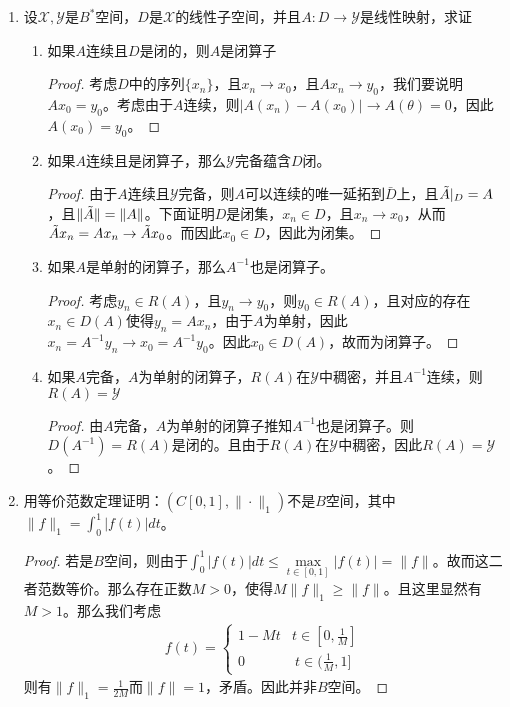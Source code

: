 \begin{enumerate}[leftmargin=2cm, label=\arabic*]
		\item 设$\mathscr{X},\mathscr{Y}$是$B^*$空间，$D$是$\mathscr{X}$的线性子空间，并且$A:D\to\mathscr{Y}$是线性映射，求证
		\begin{enumerate}[leftmargin=1cm, label=(\arabic*)]
			\item 如果$A$连续且$D$是闭的，则$A$是闭算子
			\begin{proof}
				考虑$D$中的序列$\{x_n\}$，且$x_n\to x_0$，且$Ax_n \to y_0$，我们要说明$Ax_0 = y_0$。考虑由于$A$连续，则$|A(x_n) - A(x_0)| \to A(\theta) = 0$，因此$A(x_0) = y_0$。
			\end{proof}
			
			\item 如果$A$连续且是闭算子，那么$\mathscr{Y}$完备蕴含$D$闭。
			\begin{proof}
				由于$A$连续且$\mathscr{Y}$完备，则$A$可以连续的唯一延拓到$\bar{D}$上，且$\Tilde{A}|_D = A$，且$\|\Tilde{A}\| = \|A\|$。下面证明$D$是闭集，$x_n\in D$，且$x_n\to x_0$，从而$\Tilde{A}x_n = Ax_n \to \Tilde{A}x_0$。而因此$x_0\in D$，因此为闭集。
			\end{proof}
			
			\item 如果$A$是单射的闭算子，那么$A^{-1}$也是闭算子。
			\begin{proof}
				考虑$y_n\in R(A)$，且$y_n \to y_0$，则$y_0\in R(A)$，且对应的存在$x_n\in D(A)$使得$y_n = Ax_n$，由于$A$为单射，因此$x_n = A^{-1}y_n \to x_0 = A^{-1}y_0$。因此$x_0\in D(A)$，故而为闭算子。
			\end{proof}
			
			\item 如果$A$完备，$A$为单射的闭算子，$R(A)$在$\mathscr{Y}$中稠密，并且$A^{-1}$连续，则$R(A) = \mathscr{Y}$
			\begin{proof}
				由$A$完备，$A$为单射的闭算子推知$A^{-1}$也是闭算子。则$D(A^{-1}) = R(A)$是闭的。且由于$R(A)$在$\mathscr{Y}$中稠密，因此$R(A) = \mathscr{Y}$。
			\end{proof}
			
		\end{enumerate}
		
		\item 用等价范数定理证明：$(C[0,1],\|\cdot\|_1)$不是$B$空间，其中$\|f\|_1 = \int_0^1 |f(t)|dt$。
		\begin{proof}
			若是$B$空间，则由于$\int_0^1|f(t)|dt\leqslant \max\limits_{t\in[0,1]} |f(t)| = \|f\|$。故而这二者范数等价。那么存在正数$M>0$，使得$M\|f\|_1\geqslant \|f\|$。且这里显然有$M>1$。那么我们考虑
			\begin{align*}
				f(t) = \left\lbrace\begin{array}{ll}
					1 - M t & t\in[0,\frac{1}{M}] \\
					0  & \ t\in(\frac{1}{M},1]
				\end{array} \right.
			\end{align*}
			则有$\|f\|_1 = \frac{1}{2M}$而$\|f\| = 1$，矛盾。因此并非$B$空间。
		\end{proof}
		

\end{enumerate}
